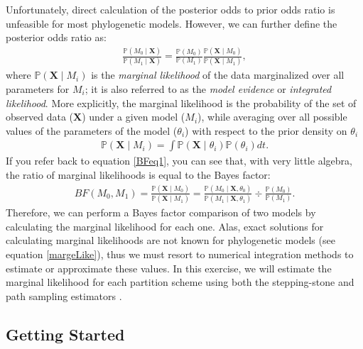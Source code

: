 Unfortunately, direct calculation of the posterior odds to prior odds ratio is unfeasible for most phylogenetic models. However, we can further define the posterior odds ratio as:
\begin{align*}
\frac{\mathbb{P}(M_0 \mid \mathbf X)}{\mathbb{P}(M_1 \mid \mathbf X)} = \frac{\mathbb{P}(M_0)}{\mathbb{P}(M_1)} \frac{\mathbb{P}(\mathbf X \mid M_0)}{\mathbb{P}(\mathbf X \mid M_1)},
\end{align*}
where $\mathbb{P}(\mathbf X \mid M_i)$ is the \textit{marginal likelihood} of the data marginalized over all parameters for $M_i$; it is also referred to as the \textit{model evidence} or \textit{integrated likelihood}.
More explicitly, the marginal likelihood is the probability of the set of observed data ($\mathbf X$) under a given model ($M_i$), while averaging over all possible values of the parameters of the model ($\theta_i$) with respect to the prior density on $\theta_i$
\begin{align}\label{margeLike}
\mathbb{P}(\mathbf X \mid M_i) = \int \mathbb{P}(\mathbf X \mid \theta_i) \mathbb{P}(\theta_i)dt.
\end{align}
If you refer back to equation \ref{BFeq1}, you can see that, with very little algebra, the ratio of marginal likelihoods is equal to the Bayes factor:
\begin{align}\label{bfFormula}
BF(M_0,M_1) = \frac{\mathbb{P}(\mathbf X \mid M_0)}{\mathbb{P}(\mathbf X \mid M_1)} = \frac{\mathbb{P}(M_0 \mid \mathbf X, \theta_0)}{\mathbb{P}(M_1 \mid \mathbf X, \theta_1)} \div \frac{\mathbb{P}(M_0)}{\mathbb{P}(M_1)}. 
\end{align}
Therefore, we can perform a Bayes factor comparison of two models by calculating the marginal likelihood for each one. %
Alas, exact solutions for calculating marginal likelihoods are not known for phylogenetic models (see equation \ref{margeLike}), thus we must resort to numerical integration methods to estimate or approximate these values. 
In this exercise, we will estimate the marginal likelihood for each partition scheme
using both the stepping-stone \citep{xie11} and path sampling estimators \citep{gelman1998,lartillot06, friel2008}. 

\bigskip
\subsection{Getting Started}


